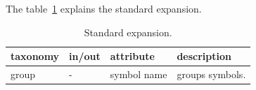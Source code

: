 \documentclass[a4paper, 12pt, openany]{scrbook}
\begin{document}
The table~\ref{tab:standard-expansion} explains the standard expansion.
\begin{table}[htbp]
\centering
\begin{tabular}{|p{3.5cm}|p{3.5cm}|p{3.5cm}|p{5cm}|}
  \hline
  \textbf{taxonomy} & \textbf{in/out} & \textbf{attribute} & \textbf{description} \\
  \hline
  group & - & symbol name & groups symbols. \\
  \hline
\end{tabular}
\caption{Standard expansion.}
\label{tab:standard-expansion}
\end{table}

\end{document}
